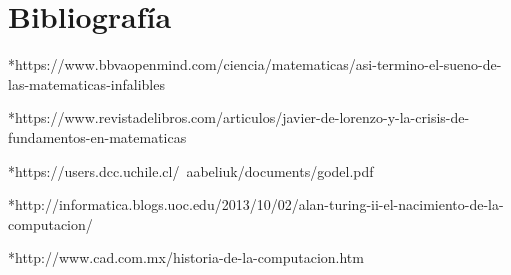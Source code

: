 \documentclass[12pt]{article}
\begin{document}
\newpage
\section{Bibliografía}

*https://www.bbvaopenmind.com/ciencia/matematicas/asi-termino-el-sueno-de-las-matematicas-infalibles

\vspace{10PT}

*https://www.revistadelibros.com/articulos/javier-de-lorenzo-y-la-crisis-de-fundamentos-en-matematicas

\vspace{10PT}

*https://users.dcc.uchile.cl/~aabeliuk/documents/godel.pdf

\vspace{10PT}

*http://informatica.blogs.uoc.edu/2013/10/02/alan-turing-ii-el-nacimiento-de-la-computacion/

\vspace{10PT}

*http://www.cad.com.mx/historia-de-la-computacion.htm

 
\end{document}
